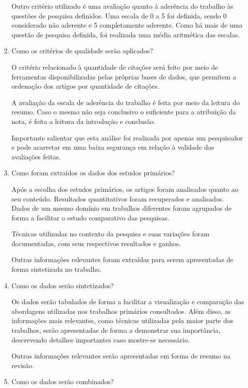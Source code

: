 \documentclass[a4paper,11pt]{article}
\begin{document}
\begin{enumerate}
Outro critério utilizado é uma avaliação quanto à aderência do trabalho às questões de pesquisa definidos. Uma escala de 0 a 5 foi definida, sendo 0 considerado não aderente e 5 completamente aderente. Como há mais de uma questão de pesquisa definida, foi realizada uma média aritmética das escalas.


\item{Como os critérios de qualidade serão aplicados?}

O critério relacionado à quantidade de citações será feito por meio de ferramentas disponibilizadas pelas próprias bases de dados, que permitem a ordenação dos artigos por quantidade de citações.

A avaliação da escala de aderência do trabalho é feita por meio da leitura do resumo. Caso o mesmo não seja conclusivo o suficiente para a atribuição da nota, é feita a leitura da introdução e conclusão.

Importante salientar que esta análise foi realizada por apenas um pesquisador e pode acarretar em uma baixa segurança em relação à validade das avaliações feitas.

\item{Como foram extraídos os dados dos estudos primários?}

Após a escolha dos estudos primários, os artigos foram analisados quanto ao seu conteúdo. Resultados quantitativos foram recuperados e analisados. Dados de um mesmo domínio em trabalhos diferentes foram agrupados de forma a facilitar o estudo comparativo das pesquisas. 

Técnicas utilizadas no contexto da pesquisa e suas variações foram documentadas, com seus respectivos resultados e ganhos.

Outras informações relevantes foram extraídas para serem apresentadas de forma sintetizada no trabalho.

\item{Como os dados serão sintetizados?}

Os dados serão tabulados de forma a facilitar a visualização e comparação das abordagens utilizadas nos trabalhos primários consultados. Além disso, as informações mais relevantes, como técnicas utilizadas pela maior parte dos trabalhos, serão apresentadas de forma a demonstrar sua importância, descrevendo detalhes importantes caso mostre-se necessário.

Outras informações relevantes serão apresentadas em forma de resumo na revisão.

\item{Como os dados serão combinados?}


\end{enumerate}
\end{document}

